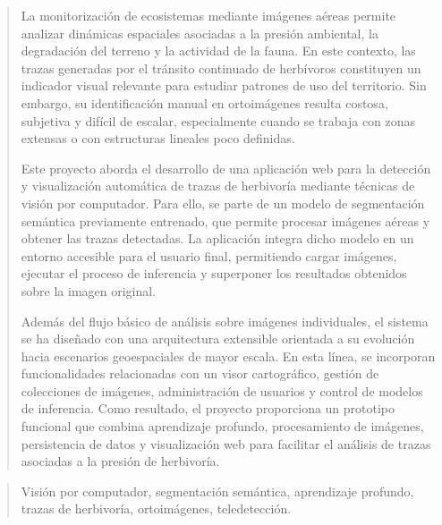 \documentclass[a4paper,12pt,twoside]{memoir}
\begin{document}
\renewcommand*\abstractname{Resumen}
\begin{abstract}
	La monitorización de ecosistemas mediante imágenes aéreas permite analizar dinámicas espaciales asociadas a la presión ambiental, la degradación del terreno y la actividad de la fauna. En este contexto, las trazas generadas por el tránsito continuado de herbívoros constituyen un indicador visual relevante para estudiar patrones de uso del territorio. Sin embargo, su identificación manual en ortoimágenes resulta costosa, subjetiva y difícil de escalar, especialmente cuando se trabaja con zonas extensas o con estructuras lineales poco definidas.
	
	Este proyecto aborda el desarrollo de una aplicación web para la detección y visualización automática de trazas de herbivoría mediante técnicas de visión por computador. Para ello, se parte de un modelo de segmentación semántica previamente entrenado, que permite procesar imágenes aéreas y obtener las trazas detectadas. La aplicación integra dicho modelo en un entorno accesible para el usuario final, permitiendo cargar imágenes, ejecutar el proceso de inferencia y superponer los resultados obtenidos sobre la imagen original.
	
	Además del flujo básico de análisis sobre imágenes individuales, el sistema se ha diseñado con una arquitectura extensible orientada a su evolución hacia escenarios geoespaciales de mayor escala. En esta línea, se incorporan funcionalidades relacionadas con un visor cartográfico, gestión de colecciones de imágenes, administración de usuarios y control de modelos de inferencia. Como resultado, el proyecto proporciona un prototipo funcional que combina aprendizaje profundo, procesamiento de imágenes, persistencia de datos y visualización web para facilitar el análisis de trazas asociadas a la presión de herbivoría.
\end{abstract}

\renewcommand*\abstractname{Descriptores}
\begin{abstract}
	Visión por computador, segmentación semántica, aprendizaje profundo, trazas de herbivoría, ortoimágenes, teledetección.
\end{abstract}

\clearpage
\end{document}
